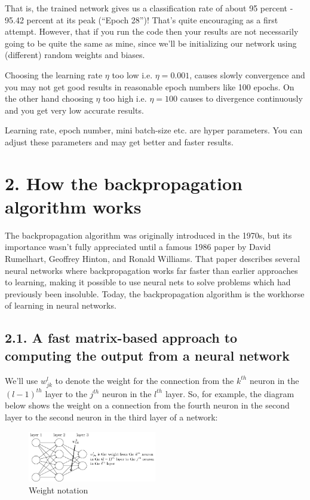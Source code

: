 \documentclass[12 pt]{article}
\begin{document}
That is, the trained network gives us a classification rate of about 95
percent - 95.42 percent at its peak (``Epoch 28'')! That's quite
encouraging as a first attempt. However, that if you run the code then
your results are not necessarily going to be quite the same as mine,
since we'll be initializing our network using (different) random weights
and biases.

Choosing the learning rate $ \eta $ too low i.e. $ \eta = 0.001
$, causes slowly convergence and you may not get good results in reasonable epoch numbers like 100 epochs. On the other hand choosing $
\eta $ too high i.e. $ \eta = 100 $ causes to divergence continuously
and you get very low accurate results.

Learning rate, epoch number, mini batch-size etc. are hyper parameters.
You can adjust these parameters and may get better and faster results.

\section{2. How the backpropagation algorithm works}
\label{how-the-backpropagation-algorithm-works}

The backpropagation algorithm was originally introduced in the 1970s,
but its importance wasn't fully appreciated until a famous 1986 paper by
David Rumelhart, Geoffrey Hinton, and Ronald Williams. That paper
describes several neural networks where backpropagation works far faster
than earlier approaches to learning, making it possible to use neural
nets to solve problems which had previously been insoluble. Today, the
backpropagation algorithm is the workhorse of learning in neural
networks.

\subsection{2.1. A fast matrix-based approach to computing the
output from a neural network}
\label{warm-up-a-fast-matrix-based-approach-to-computing-the-output-from-a-neural-network}

We'll use $ w^l_{jk} $ to denote the weight for the connection
from the $ k^{th} $ neuron in the $ (l − 1)^{th} $ layer
to the $ j^{th} $ neuron in the $ l^{th} $ layer. So, for
example, the diagram below shows the weight on a connection from the
fourth neuron in the second layer to the second neuron in the third
layer of a network:

\begin{figure}[htp]
\centering
\includegraphics[width=0.5\textwidth]{./figs/tikz16.png}
\caption{Weight notation}
\end{figure}
\end{document}
